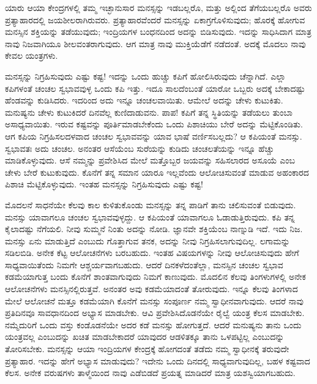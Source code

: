 \newpage

ಯಾರು ಆಯಾ ಕೇಂದ್ರಗಳಲ್ಲಿ ತಮ್ಮ ಇಚ್ಛಾನುಸಾರ ಮನಸ್ಸನ್ನು ಇಡಬಲ್ಲರೊ, ಮತ್ತು ಅಲ್ಲಿಂದ ತೆಗೆಯಬಲ್ಲರೊ ಅವರು ಪ್ರತ್ಯಾಹಾರದಲ್ಲಿ ಜಯಶೀಲರಾಗಿರುವರು. ಪ್ರತ್ಯಾಹಾರವೆಂದರೆ ಮನಸ್ಸನ್ನು ಏಕಾಗ್ರಗೊಳಿಸುವುದು; ಹೊರಕ್ಕೆ ಹೋಗುವ ಮನಸ್ಸಿನ ಶಕ್ತಿಯನ್ನು ತಡೆಯುವುದು; ಇಂದ್ರಿಯಗಳ ಬಂಧನದಿಂದ ಅದನ್ನು ಬಿಡಿಸುವುದು. ಇದನ್ನು ಸಾಧಿಸಿದಾಗ ಮಾತ್ರ ನಾವು ನಿಜವಾಗಿಯೂ ಶೀಲವಂತರಾಗುವುದು. ಆಗ ಮಾತ್ರ ನಾವು ಮುಕ್ತಿಯೆಡೆಗೆ ನಡೆದಂತೆ. ಅದಕ್ಕೆ ಮೊದಲು ನಾವು ಕೇವಲ ಯಂತ್ರಗಳು. 

ಮನಸ್ಸನ್ನು ನಿಗ್ರಹಿಸುವುದು ಎಷ್ಟು ಕಷ್ಟ! ಇದನ್ನು ಒಂದು ಹುಚ್ಚು ಕಪಿಗೆ ಹೋಲಿಸಿರುವುದು ಚೆನ್ನಾಗಿದೆ. ಎಲ್ಲಾ ಕಪಿಗಳಂತೆ ಚಂಚಲ ಸ್ವಭಾವವುಳ್ಳ ಒಂದು ಕಪಿ ಇತ್ತು. ಇದೂ ಸಾಲದೆಂಬಂತೆ ಯಾರೋ ಒಬ್ಬರು ಅದಕ್ಕೆ ಬೇಕಾದಷ್ಟು ಹೆಂಡವನ್ನು ಕುಡಿಸಿದರು. ಇದರಿಂದ ಅದು ಇನ್ನೂ ಚಂಚಲವಾಯಿತು. ಆಮೇಲೆ ಅದನ್ನು ಚೇಳು ಕುಟುಕಿತು. ಮನುಷ್ಯನು ಚೇಳು ಕುಟುಕಿದರೆ ದಿನವೆಲ್ಲ ಕುಣಿದಾಡುವನು. ಪಾಪ! ಕಪಿಗೆ ತನ್ನ ಸ್ಥಿತಿಯನ್ನು ತಡೆಯಲು ತುಂಬಾ ಅಸಾಧ್ಯವಾಯಿತು. ಇರುವ ಕಷ್ಟವನ್ನು ಪೂರ್ತಿಮಾಡಬೇಕೆಂದು ಒಂದು ಪಿಶಾಚಿಯು ಬೇರೆ ಅದನ್ನು ಮೆಟ್ಟಿಕೊಂಡಿತು. ಆಗ ಕಪಿಯ ನಿಗ್ರಹಿಸಲದಳವಾದ ಚಂಚಲ ಸ್ವಭಾವವನ್ನು ಯಾವ ಭಾಷೆ ವರ್ಣಿಸಬಲ್ಲದು? ಆ ಕಪಿಯಂತೆ ಮನಸ್ಸು. ಸ್ವಭಾವತಃ ಅದು ಚಂಚಲ. ಅನಂತರ ಆಸೆಯೆಂಬ ಸುರೆಯನ್ನು ಕುಡಿದು ಚಂಚಲತೆಯನ್ನು ಇನ್ನೂ ಹೆಚ್ಚು ಮಾಡಿಕೊಳ್ಳುವುದು. ಆಸೆ ನಮ್ಮನ್ನು ಪ್ರವೇಶಿಸಿದ ಮೇಲೆ ಮತ್ತೊಬ್ಬರ ಜಯವನ್ನು ಸಹಿಸಲಾರದ ಅಸೂಯೆ ಎಂಬ ಚೇಳು ಬೇರೆ ಕುಟುಕುವುದು. ಕೊನೆಗೆ ತನ್ನ ಸಮಾನ ಯಾರೂ ಇಲ್ಲವೆಂದು ಆಲೋಚಿಸುವಂತೆ ಮಾಡುವ ಅಹಂಕಾರದ ಪಿಶಾಚಿ ಮೆಟ್ಟಿಕೊಳ್ಳುವುದು. ಇಂತಹ ಮನಸ್ಸನ್ನು ನಿಗ್ರಹಿಸುವುದು ಎಷ್ಟು ಕಷ್ಟ!

ಮೊದಲನೆ ಸಾಧನೆಯೇ ಕೆಲವು ಕಾಲ ಕುಳಿತುಕೊಂಡು ಮನಸ್ಸನ್ನು ತನ್ನ ಪಾಡಿಗೆ ತಾನು ಚಲಿಸುವಂತೆ ಬಿಡುವುದು. ಮನಸ್ಸು ಯಾವಾಗಲೂ ಚಂಚಲ ಸ್ವಭಾವವುಳ್ಳದ್ದು. ಆ ಕಪಿಯಂತೆ ಯಾವಾಗಲೂ ಓಡಾಡುತ್ತಿರುವುದು. ಕಪಿ ತನ್ನ ಕೈಲಾದಷ್ಟು ನೆಗೆಯಲಿ. ನೀವು ಸುಮ್ಮನೆ ನಿಂತು ಅದನ್ನು ನೋಡಿ. ಜ್ಞಾನವೇ ಶಕ್ತಿಯೆಂಬ ನಾಣ್ನುಡಿ ಇದೆ. ಇದು ನಿಜ. ಮನಸ್ಸು ಏನು ಮಾಡುತ್ತಿದೆ ಎಂಬುದು ಗೊತ್ತಾಗುವ ತನಕ, ಅದನ್ನು ನೀವು ನಿಗ್ರಹಿಸಲಾಗುವುದಿಲ್ಲ. ಲಗಾಮನ್ನು ಸಡಿಲಬಿಡಿ. ಅನೇಕ ಕೆಟ್ಟ ಆಲೋಚನೆಗಳು ಬರಬಹುದು. ಇಂತಹ ವಿಷಯಗಳನ್ನು ನೀವು ಆಲೋಚಿಸುವುದು ಹೇಗೆ ಸಾಧ್ಯವಾಯಿತೆಂದು ನಿಮಗೇ ಆಶ್ಚರ್ಯವಾಗಬಹುದು. ಆದರೆ ದಿನಕಳೆದಂತೆಲ್ಲಾ, ಮನಸ್ಸಿನ ಚಂಚಲ ಸ್ವಭಾವ ಕಡಮೆಯಾಗುತ್ತ ಬಂದು ಕೊನೆಗೆ ಶಾಂತವಾಗುವುದು ನಿಮಗೆ ಕಾಣುವುದು. ಮೊದಲಿನ ಕೆಲವು ತಿಂಗಳುಗಳಲ್ಲಿ ಅನೇಕ ಆಲೋಚನೆಗಳು ಮನಸ್ಸಿನಲ್ಲಿರುತ್ತವೆ. ಅನಂತರ ಅವು ಕಡಮೆಯಾದಂತೆ ತೋರುವುದು. ಇನ್ನೂ ಕೆಲವು ತಿಂಗಳಾದ ಮೇಲೆ ಆಲೋಚನೆ ಮತ್ತೂ ಕಡಮೆಯಾಗಿ ಕೊನೆಗೆ ಮನಸ್ಸು ಸಂಪೂರ್ಣ ನಮ್ಮ ಸ್ವಾಧೀನವಾಗುವುದು. ಆದರೆ ನಾವು ಪ್ರತಿದಿನವೂ ಸಾವಧಾನದಿಂದ ಅಭ್ಯಾಸ ಮಾಡಬೇಕು. ಆವಿ ಪ್ರವೇಶಿಸಿದೊಡನೆಯೇ ರೈಲ್ವೆ ಯಂತ್ರ ಕೆಲಸ ಮಾಡಬೇಕು. ನಮ್ಮೆದುರಿಗೆ ಒಂದು ವಸ್ತು ಕಂಡೊಡನೆಯೇ ಅದರ ಕಡೆ ಮನಸ್ಸು ಹೋಗುತ್ತದೆ. ಆದರೆ ಮನುಷ್ಯನು ತಾನು ಒಂದು ಯಂತ್ರವಲ್ಲ ಎಂಬುದನ್ನು ಖಚಿತ ಮಾಡಬೇಕಾದರೆ ಯಾವುದರ ಆಡಳಿತಕ್ಕೂ ತಾನು ಒಳಪಟ್ಟಿಲ್ಲ ಎಂಬುದನ್ನು ತೋರಿಸಬೇಕು. ಮನಸ್ಸನ್ನು ಆಯಾ ಇಂದ್ರಿಯಗಳ ಕೇಂದ್ರಕ್ಕೆ ಹೋಗದಂತೆ ತಡೆದು ನಮ್ಮ ಸ್ವಾಧೀನಕ್ಕೆ ತರುವುದೇ ಪ್ರತ್ಯಾಹಾರ. ಇದನ್ನು ಹೇಗೆ ಅಭ್ಯಾಸ ಮಾಡುವುದು? ಇದೇನು ಒಂದು ದಿನದಲ್ಲಿ ಸಾಧ್ಯವಾಗುವುದಿಲ್ಲ, ಬಹಳ ಕಷ್ಟವಾದ ಕೆಲಸ. ಅನೇಕ ವರುಷಗಳು ತಾಳ್ಮೆಯಿಂದ ನಾವು ಎಡೆಬಿಡದೆ ಪ್ರಯತ್ನ ಮಾಡಿದರೆ ಮಾತ್ರ ಯಶಸ್ವಿಯಾಗಬಹುದು. 

